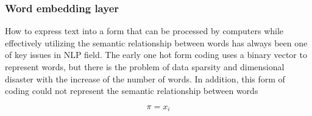 \documentclass{article}
\begin{document}
\subsubsection{Word embedding layer}
How to express text into a form that can be processed by computers while effectively utilizing the semantic relationship between words 
has always been one of key issues in NLP field. The early one hot form coding uses a binary vector to represent words, but there is the problem of 
data sparsity and dimensional disaster with the increase of the number of words. In addition, this form of coding could not represent the semantic 
relationship between words

\begin{equation}
	\pi=x_i
\end{equation}
\end{document}
